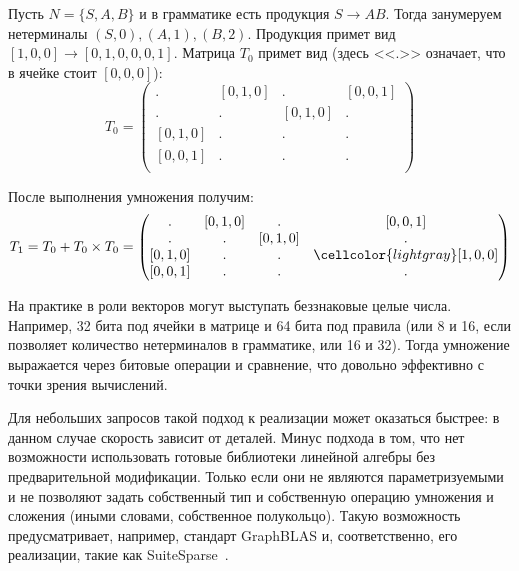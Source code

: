 \begin{example}
Пусть $N = \{S, A, B\}$ и в грамматике есть продукция $S \to A B$. Тогда занумеруем нетерминалы $ (S, 0), (A, 1), (B, 2)$. Продукция примет вид $[1, 0, 0] \to [0, 1, 0, 0, 0, 1]$. Матрица $T_0$ примет вид (здесь <<$.$>> означает, что в ячейке стоит $[0,0,0]$):
\[
T_0 = \begin{pmatrix}
. & [0,1,0]       & . & [0,0,1]       \\
. & . & [0,1,0]       & . \\
[0,1,0]       & . & . & . \\
[0,0,1]      & . & . & . \\
\end{pmatrix}
\]

После выполнения умножения получим:
\[
T_1 = T_0 + T_0 \times T_0 =
\begin{pmatrix}
. & [0,1,0]       & . & [0,0,1]       \\
. & . & [0,1,0]       & . \\
[0,1,0]       & . & . & \cellcolor{lightgray}[1,0,0] \\
[0,0,1]      & . & . & . \\
\end{pmatrix}
\]
\end{example}


На практике в роли векторов могут выступать беззнаковые целые числа.
Например, 32 бита под ячейки в матрице и 64 бита под правила (или 8 и 16, если позволяет количество нетерминалов в грамматике, или 16 и 32).
Тогда умножение выражается через битовые операции и сравнение, что довольно эффективно с точки зрения вычислений.

Для небольших запросов такой подход к реализации может оказаться быстрее: в данном случае скорость зависит от деталей.
Минус подхода в том, что нет возможности использовать готовые библиотеки линейной алгебры без предварительной модификации.
Только если они не являются параметризуемыми и не позволяют задать собственный тип и собственную операцию умножения и сложения (иными словами, собственное полукольцо).
Такую возможность предусматривает, например, стандарт GraphBLAS и, соответственно, его реализации, такие как SuiteSparse~\cite{Davis2018Algorithm9S}.

